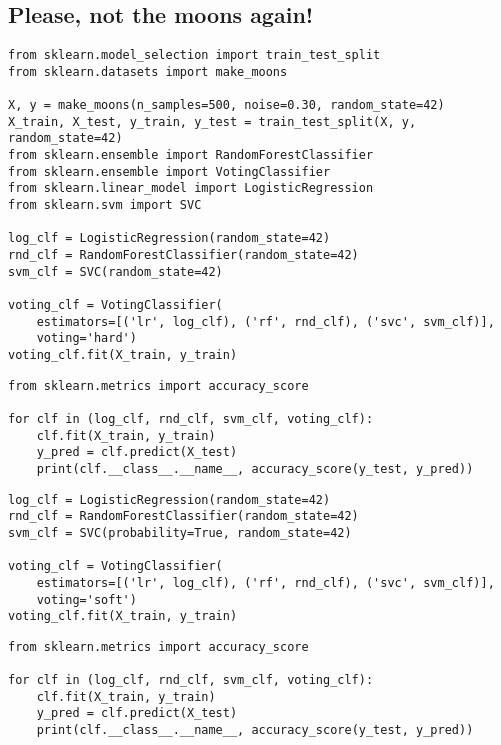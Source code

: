 \documentclass[%
oneside,                 %
final,                   %
10pt]{article}
\begin{document}
\subsection*{Please, not the moons again!}
\begin{verbatim}
from sklearn.model_selection import train_test_split
from sklearn.datasets import make_moons

X, y = make_moons(n_samples=500, noise=0.30, random_state=42)
X_train, X_test, y_train, y_test = train_test_split(X, y, random_state=42)
from sklearn.ensemble import RandomForestClassifier
from sklearn.ensemble import VotingClassifier
from sklearn.linear_model import LogisticRegression
from sklearn.svm import SVC

log_clf = LogisticRegression(random_state=42)
rnd_clf = RandomForestClassifier(random_state=42)
svm_clf = SVC(random_state=42)

voting_clf = VotingClassifier(
    estimators=[('lr', log_clf), ('rf', rnd_clf), ('svc', svm_clf)],
    voting='hard')
voting_clf.fit(X_train, y_train)
\end{verbatim}

\begin{verbatim}
from sklearn.metrics import accuracy_score

for clf in (log_clf, rnd_clf, svm_clf, voting_clf):
    clf.fit(X_train, y_train)
    y_pred = clf.predict(X_test)
    print(clf.__class__.__name__, accuracy_score(y_test, y_pred))
\end{verbatim}

\begin{verbatim}
log_clf = LogisticRegression(random_state=42)
rnd_clf = RandomForestClassifier(random_state=42)
svm_clf = SVC(probability=True, random_state=42)

voting_clf = VotingClassifier(
    estimators=[('lr', log_clf), ('rf', rnd_clf), ('svc', svm_clf)],
    voting='soft')
voting_clf.fit(X_train, y_train)
\end{verbatim}

\begin{verbatim}
from sklearn.metrics import accuracy_score

for clf in (log_clf, rnd_clf, svm_clf, voting_clf):
    clf.fit(X_train, y_train)
    y_pred = clf.predict(X_test)
    print(clf.__class__.__name__, accuracy_score(y_test, y_pred))
\end{verbatim}
\end{document}
